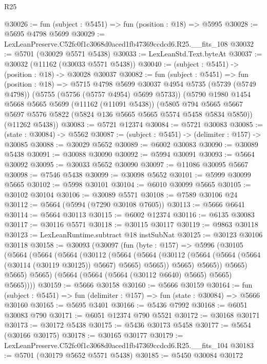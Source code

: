 \begin{lexlean}{R25}
\begin{coremodule}
@30026 := fun (subject : @5451) => fun (position : @18) => @5995
@30028 := @5695 @4798 @5699
@30029 := LexLeanPreserve.C52fc0f1c3068d0aced1fb47369ccdcd6.R25.__fits_108
@30032 := @5701 (@30029 @5571 @5438)
@30033 := LexLeanStd.Text.byteAt
@30037 := @30032 (@11162 (@30033 @5571 @5438))
@30040 := (subject : @5451) -> (position : @18) -> @30028 @30037
@30082 := fun (subject : @5451) =>
  fun (position : @18) =>
  @5715
    @4798
    @5699
    @30037
    @4954
    @5735
    (@5739 (@5749 @4798))
    (@5755 (@5756 (@5757 @4954) @5699 @5733))
    (@5790
      @1980
      @1454
      @5668
      @5665
      @5699
      (@11162 (@11091 @5438))
      (@5805 @794 @5665 @5667 @5697 @5576 @5822 (@5824 @136 @5665 @5665 @5574 @5458 @5834 @5850))
      (@11262 @5438))
@30083 := @5721 @12374
@30084 := @5721 @30083
@30085 := (state : @30084) -> @5562
@30087 := (subject : @5451) -> (delimiter : @157) -> @30085
@30088 := @30029 @5652
@30089 := @6002 @30083
@30090 := @30089 @5438
@30091 := @30088 @30090
@30092 := @5994 @30091
@30093 := @5664 @30092
@30095 := @30033 @5652 @30090
@30097 := @11086 @30095 @5667
@30098 := @7546 @5438
@30099 := @30098 @5652
@30101 := @5999 @30099 @5665
@30102 := @5998 @30101
@30104 := @6010 @30099 @5665
@30105 := @30102 @30104
@30106 := @30089 @5571
@30108 := @7589 @30106 @24
@30112 := @5664 (@5994 (@7290 @30108 @7605))
@30113 := @5666 @6641
@30114 := @5664 @30113
@30115 := @6002 @12374
@30116 := @6135 @30083
@30117 := @30116 @5571
@30118 := @30115 @30117
@30119 := @9863 @30118
@30123 := LexLeanRuntime.subtract @18 instSubNat
@30125 := @30123 @30106 @30118
@30158 := @30093
    (@30097
      (fun (byte : @157) =>
      @5996
        (@30105
          (@5664
            (@5664
              (@5664
                (@30112
                  (@5664
                    (@5664
                      (@30112 (@5664 (@5664 (@5664 (@30114 (@30119 @30125)) @5667) @5665) @5665))
                      @5665)
                    @5665))
                @5665)
              @5665)
            @5665)
          (@5664 (@5664 (@5664 (@30112 @6640) @5665) @5665) @5665))))
@30159 := @5666 @30158
@30160 := @5666 @30159
@30164 := fun (subject : @5451) => fun (delimiter : @157) => fun (state : @30084) => @5666 @30160
@30165 := @5695 @3401
@30166 := @5436 @7992
@30168 := @6051 @30083 @790
@30171 := @6051 @12374 @790 @5521
@30172 := @30168 @30171
@30173 := @30172 @5438
@30175 := @5436 @30173 @5458
@30177 := @5654 (@30166 @30175)
@30178 := @30165 @30177
@30179 := LexLeanPreserve.C52fc0f1c3068d0aced1fb47369ccdcd6.R25.__fits_104
@30183 := @5701 (@30179 @5652 @5571 @5438)
@30185 := @5450 @30084 @30172

\end{coremodule}
\end{lexlean}
